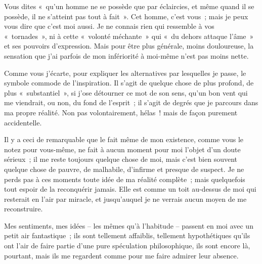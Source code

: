 	{

Vous dites «~qu'un homme ne se possède que par éclaircies, et même
quand il se possède, il ne s'atteint pas tout à fait~». Cet homme,
c'est vous~; mais je peux vous dire que c'est moi aussi. Je ne
connais rien qui ressemble à vos «~tornades~», ni à cette «~volonté
méchante~» qui «~du dehors attaque l'âme~» et ses pouvoirs
d'expression. Mais pour être plus générale, moins douloureuse, la
sensation que j'ai parfois de mon infériorité à moi-même n'est pas
moins nette.

Comme vous j'écarte, pour expliquer les alternatives par lesquelles je
passe, le symbole commode de l'inspiration. Il s'agit de quelque
chose de plus profond, de plus «~substantiel~», si j'ose détourner ce
mot de son sens, qu'un bon vent qui me viendrait, ou non, du fond de
l'esprit~; il s'agit de degrés que je parcours dans ma propre
réalité. Non pas volontairement, hélas~! mais de façon purement
accidentelle.

Il y a ceci de remarquable que le fait même de mon existence, comme
vous le notez pour vous-même, ne fait à aucun moment pour moi l'objet
d'un doute sérieux~; il me reste toujours quelque chose de moi, mais
c'est bien souvent quelque chose de pauvre, de malhabile, d'infirme
et presque de suspect. Je ne perds pas à ces moments toute idée de ma
réalité complète~; mais quelquefois tout espoir de la reconquérir
jamais. Elle est comme un toit au-dessus de moi qui resterait en
l'air par miracle, et jusqu'auquel je ne verrais aucun moyen de me
reconstruire.

Mes sentiments, mes idées – les mêmes qu'à l'habitude – passent en moi
avec un petit air fantastique~; ils sont tellement affaiblis,
tellement hypothétiques qu'ils ont l'air de faire partie d'une pure
spéculation philosophique, ils sont encore là, pourtant, mais ils me
regardent comme pour me faire admirer leur absence.

}
